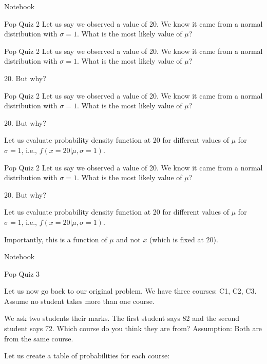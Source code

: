 \documentclass[handout]{beamer}
\begin{document}
\begin{frame}
  Notebook  
\end{frame}

\begin{frame}{Pop Quiz 2}
    Let us say we observed a value of 20. We know it came from a normal distribution with $\sigma=1$. What is the most likely value of $\mu$?
    


\end{frame}

\begin{frame}{Pop Quiz 2}
    Let us say we observed a value of 20. We know it came from a normal distribution with $\sigma=1$. What is the most likely value of $\mu$?
    
    20. But why?


\end{frame}

\begin{frame}{Pop Quiz 2}
    Let us say we observed a value of 20. We know it came from a normal distribution with $\sigma=1$. What is the most likely value of $\mu$?
    
    20. But why?

    Let us evaluate probability density function at 20 for different values of $\mu$ for $\sigma=1$, i.e., $f(x=20|\mu, \sigma=1)$.


\end{frame}

\begin{frame}{Pop Quiz 2}
    Let us say we observed a value of 20. We know it came from a normal distribution with $\sigma=1$. What is the most likely value of $\mu$?
    
    20. But why?

    Let us evaluate probability density function at 20 for different values of $\mu$ for $\sigma=1$, i.e., $f(x=20|\mu, \sigma=1)$.

    Importantly, this is a function of $\mu$ and not $x$ (which is fixed at 20).

\end{frame}

\begin{frame}
    Notebook
\end{frame}

\begin{frame}{Pop Quiz 3}


Let us now go back to our original problem. We have three courses: C1, C2, C3. Assume no student takes more than one course.

We ask two students their marks. The first student says 82 and the second student says 72. Which course do you think they are from? Assumption: Both are from the same course.

Let us create a table of probabilities for each course:




    
\end{frame}
\end{document}
